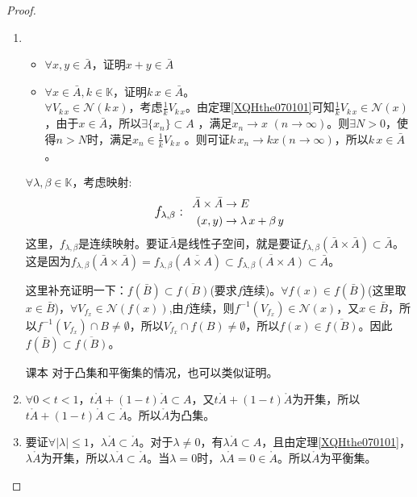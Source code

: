 \begin{proof}
	\begin{enumerate}
		\item 
			\unfinished
			{\begin{itemize}
			\item $\forall x,y\in \bar{A} $，证明$x+y \in \bar{A}$
			\item $\forall x\in \bar{A} ,k\in \mathbb{K}  $，证明$k\, x\in \bar{A} $。\\
				$\forall V_{k\, x}\in \mathcal{N}(k\, x) $，考虑$\frac{1}{k} V_{k\, x } $。由定理\ref{XQHthe070101}可知$\frac{1}{k}V_{k\,x } \in \mathcal{N}( x ) $，由于$x\in \bar{A} $，所以$\exists \{x_{n}\} \subset A $ ，满足$x_{n} \rightarrow x \,\,(n\rightarrow\infty) $。则$\exists N>0$，使得$n > N$时，满足$x_{n} \in \frac{1}{k}V_{k\, x}$ 。则可证$k\, x_{n} \rightarrow kx (n\rightarrow\infty) $，所以$k\, x\in \bar{A} $。
			\end{itemize}
			}
		\finished
		{
			$\forall \lambda ,\beta \in \mathbb{K} $，考虑映射:
			\begin{equation*}
				{\large\text{$f_{\lambda,\beta}:\,\,\,\,$}}
				\begin{aligned}
					\bar{A}\times\bar{A}&\rightarrow E\\
					(x,y)&\rightarrow \lambda \, x+\beta \, y
				\end{aligned}
			\end{equation*}
		这里，$f_{\lambda,\beta}$是连续映射。要证$\bar{A}$是线性子空间，就是要证$f_{\lambda,\beta}(\bar{A}\times \bar{A})\subset \bar{A} $。这是因为$f_{\lambda,\beta}(\bar{A}\times\bar{A} ) = f_{\lambda,\beta }( \overline{A\times A} ) \subset \overline{ f_{\lambda,\beta}(A\times A) } \subset \bar{A}  $。\par
		这里补充证明一下：$f(\bar{B}) \subset \overline{f(B)} $(要求$f$连续)。$\forall f(x)\in f(\bar{B})  $(这里取$x\in \bar{B} $)，$\forall V_{f_{x}}\in \mathcal{N}(f(x)) $,由$f$连续，则$f^{-1}(V_{f_{x}}) \in \mathcal{N}(x) $，又$x\in \bar{B} $，所以$f^{-1}(V_{f_{x}})\cap B\neq \emptyset $，所以$V_{f_{x}}\cap f(B) \neq \emptyset $，所以$f(x)\in \overline{f(B)} $。因此$f(\bar{B}) \subset \overline{f(B)} $。
		}
	  {课本}
	   对于凸集和平衡集的情况，也可以类似证明。
		\item $\forall 0<t<1 $，$t \mathring{A} + (1-t) \mathring{A} \subset A $，又$t \mathring{A} + (1-t) \mathring{A} $为开集，所以$t \mathring{A} + (1-t) \mathring{A}\subset \mathring{A} $。所以$\mathring{A} $为凸集。
		\item 要证$\forall |\lambda|\leq 1 $，$\lambda \mathring{A} \subset \mathring{A} $。对于$\lambda \neq 0 $，有$\lambda \mathring{A} \subset A $，且由定理\ref{XQHthe070101}，$\lambda \mathring{A} $为开集，所以$\lambda \mathring{A} \subset \mathring{A} $。当$\lambda =0 $时，$\lambda \mathring{A}=0\in \mathring{A} $。所以$\mathring{A} $为平衡集。
	\end{enumerate}
\end{proof}

